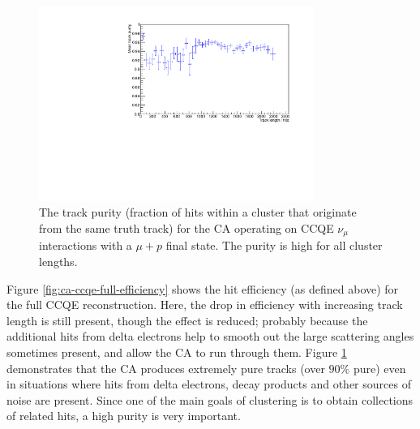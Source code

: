 \begin{figure}
    \centering
    \includegraphics[angle=-90,width=0.8\textwidth]{chapters/cellularautomaton_images/ccqe-purity}
    \caption[Track purity for CCQE events reconstructed with a CA]{\label{fig:ca-ccqe-full-purity}The track purity (fraction of hits within a cluster that originate from the same truth track) for the CA operating on CCQE $\nu_\mu$ interactions with a $\mu + p$ final state. The purity is high for all cluster lengths.}
\end{figure}

Figure \ref{fig:ca-ccqe-full-efficiency} shows the hit efficiency (as defined above) for the full CCQE reconstruction. Here, the drop in efficiency with increasing track length is still present, though the effect is reduced; probably because the additional hits from delta electrons help to smooth out the large scattering angles sometimes present, and allow the \ac{CA} to run through them. Figure \ref{fig:ca-ccqe-full-purity} demonstrates that the \ac{CA} produces extremely pure tracks (over $90\%$ pure) even in situations where hits from delta electrons, decay products and other sources of noise are present. Since one of the main goals of clustering is to obtain collections of related hits, a high purity is very important.

